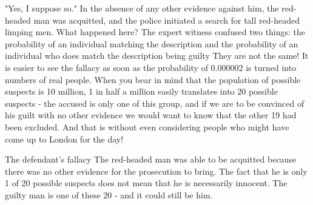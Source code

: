 "Yes, I suppose so."
In the absence of any other evidence against him, the red-headed man was acquitted, and the police initiated a search for tall red-headed limping men.
What happened here?
The expert witness confused two things:
the probability of an individual matching the description
and the probability of an individual who does match the description being guilty
They are not the same!
It is easier to see the fallacy as soon as the probability of 0.000002 is turned into numbers of real people. When you bear in mind that the population of possible suspects is 10 million, 1 in half a million easily translates into 20 possible suspects - the accused is only one of this group, and if we are to be convinced of his guilt with no other evidence we would want to know that the other 19 had been excluded.
And that is without even considering people who might have come up to London for the day!


The defendant's fallacy
The red-headed man was able to be acquitted because there was no other evidence for the prosecution to bring. The fact that he is only 1 of 20 possible suspects does not mean that he is necessarily innocent. The guilty man is one of these 20 - and it could still be him.


